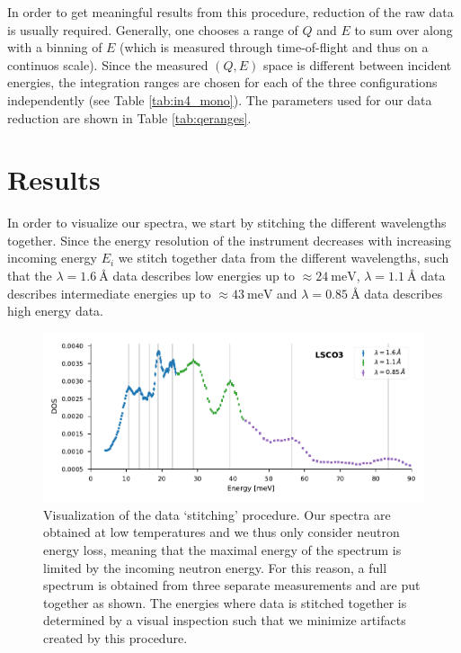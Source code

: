  In order to get meaningful results from this procedure, reduction of the raw data is usually required. Generally, one chooses a range of $Q$ and $E$ to sum over along with a binning of $E$ (which is measured through time-of-flight and thus on a continuos scale). Since the measured $(Q, E)$ space is different between incident energies, the integration  ranges are chosen for each of the three configurations independently (see Table \ref{tab:in4_mono}). The parameters used for our data reduction are shown in Table \ref{tab:qeranges}.
 
\section{Results}
In order to visualize our spectra, we start by stitching the different wavelengths together. Since the energy resolution of the instrument decreases with increasing incoming energy $E_i$ we stitch together data from the different wavelengths, such that the $\lambda = \SI{1.6}{\angstrom}$ data describes low energies up to $\approx \SI{24}{\milli\eV}$, $\lambda = \SI{1.1}{\angstrom}$ data describes intermediate energies up to $\approx \SI{43}{\milli\eV}$ and $\lambda = \SI{0.85}{\angstrom}$ data describes high energy data.

\begin{figure}
    \centering
    \includegraphics[width=\textwidth]{fig/gdos/in4_lsco3_10k.pdf}
    \caption[gDOS of LSCO3 at 10K. Visualize stitching of data.]{Visualization of the data `stitching' procedure. Our spectra are obtained at low temperatures and we thus only consider neutron energy loss, meaning that the maximal energy of the spectrum is limited by the incoming neutron energy. For this reason, a full spectrum is obtained from three separate measurements and are put together as shown. The energies where data is stitched together is determined by a visual inspection such that we minimize artifacts created by this procedure.}
    \label{fig:in4_stitch}
\end{figure}

